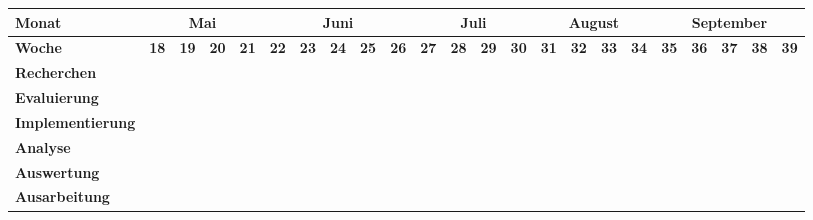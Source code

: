 \documentclass[lang=ngerman,inputenc=utf8,fontsize=10pt]{ldvarticle}
\begin{document}
\begin{itemize}
\begin{center}
\begin{footnotesize}
\setlength{\arrayrulewidth}{1,05pt}
\begin{tabular}[htb]{|m{}|p{.05cm}|p{.05cm}|p{.05cm}|p{.05cm}|p{.05cm}|p{.05cm}|p{.05cm}|p{.05cm}|p{.05cm}|p{.05cm}|p{.05cm}|p{.05cm}|p{.05cm}|p{.05cm}|p{.05cm}|p{.05cm}|p{.05cm}|p{.05cm}|p{.05cm}|p{.05cm}|p{.05cm}|p{.05cm}|}
	\hline
	\textbf{Monat}& \multicolumn{4}{|c|}{Mai} & \multicolumn{5}{|c|}{Juni} & \multicolumn{4}{|c|}{Juli} & \multicolumn{4}{|c|}{August} & \multicolumn{5}{|c|}{September}\\ 
	\hline
	\textbf{Woche}&\tiny\textbf{18}&\tiny\textbf{19}&\tiny\textbf{20}&\tiny\textbf{21}& \tiny \textbf{22} & \tiny \textbf{23} & \tiny \textbf{24} & \tiny \textbf{25} &  \tiny \textbf{26} &  \tiny \textbf{27} &  \tiny \textbf{28} &  \tiny \textbf{29}  &  \tiny \textbf{30} &  \tiny \textbf{31} &  \tiny \textbf{32} &  \tiny \textbf{33} &  \tiny \textbf{34} &  \tiny \textbf{35}  &  \tiny \textbf{36} &  \tiny \textbf{37} &  \tiny \textbf{38}  &  \tiny \textbf{39}\\
	\hline
	\hline
	\rowcolor{lightgray} \textbf{Recherchen}& \cellcolor{red} & \cellcolor{red} & \cellcolor{red}& \cellcolor{red}& \cellcolor{red}& & & & & & & & & & & & & & & & &\\
	\hline
	\rowcolor{lightgray} \textbf{Evaluierung}& & & & & & \cellcolor{red} & \cellcolor{red} & & & & & & & & & & & & & & &\\
	\hline
	\rowcolor{lightgray} \textbf{Implementierung}& & & & & & & & \cellcolor{red} & \cellcolor{red} & \cellcolor{red} & \cellcolor{red} & \cellcolor{red} & & & & & & & & & &\\
	\hline
	\rowcolor{lightgray} \textbf{Analyse}& & & & & & & & & & & & & \cellcolor{red}& \cellcolor{red}& \cellcolor{red} & \cellcolor{red} & & & & & &\\
	\hline
	\rowcolor{lightgray} \textbf{Auswertung}& & & & & & & & & & & & & & & & \cellcolor{red} & \cellcolor{red} & \cellcolor{red} & & & &\\
	\hline
	\rowcolor{lightgray} \textbf{Ausarbeitung}& & & & & & & & & & & & & & & & & \cellcolor{red} &\cellcolor{red} & \cellcolor{red}& \cellcolor{red} &\cellcolor{red} & \cellcolor{red}\\
	\hline
		
\end{tabular}
\end{footnotesize}
\end{center}


\end{itemize}
\end{document}
